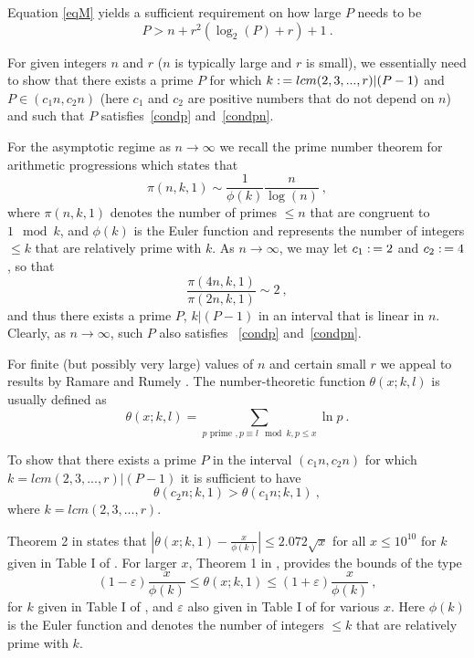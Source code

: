 Equation \eqref{eqM} yields a sufficient requirement on how large
$P$ needs to be
\begin{equation}\label{condpn}P>n+r^2(\log_2(P)+r)+1~.
\end{equation}

For given integers $n$ and $r$ ($n$ is typically large and $r$ is
small), we essentially need to show that there exists a prime $P$
for which $k \asn lcm(2,3,...,r) | (P-1)$ and $P \in (c_1n,c_2n)$
(here $c_1$ and $c_2$ are positive numbers that do not depend on
$n$) and such that $P$ satisfies~\eqref{condp} and~\eqref{condpn}.

For the asymptotic regime as $n \rightarrow \infty$ we recall the
prime number theorem for arithmetic progressions \cite{sopro} which
states that
\begin{equation}
\pi(n,k,1) \sim \frac{1}{\phi(k)} \frac{n}{\log(n)}~,
\end{equation}
where $\pi(n,k,1)$ denotes the number of primes $\leq n$ that are
congruent to $1 \mod k$, and $\phi(k)$ is the Euler function and
represents the number of integers $\leq k$ that are relatively prime
with $k$. As $n \rightarrow \infty$, we may let $c_1 \asn 2$ and
$c_2 \asn 4$, so that
\begin{equation}
\frac{\pi(4n,k,1)}{\pi(2n,k,1)} \sim 2~,
\end{equation}
and thus there exists a prime $P$, $k | (P-1)$ in an interval that
is linear in $n$. Clearly, as $n \rightarrow \infty$, such $P$ also
satisfies ~\eqref{condp} and~\eqref{condpn}.



For finite (but possibly very large) values of $n$ and certain small
$r$ we appeal to results by Ramare and Rumely \cite{rrumely}. The
number-theoretic function $\theta(x;k,l)$ is usually defined as
\[\theta(x;k,l)=\sum_{p \text{ prime }, p \equiv l\mod k, p
\leq x} \ln p~.\]

To show that there exists a prime $P$ in the interval $(c_1n,c_2n)$
for which $k=lcm(2,3,...,r) | (P-1)$  it is sufficient to have
\begin{equation} \label{thetas}\theta(c_2n;k,1)> \theta(c_1n;k,1)~,\end{equation}
where $k=lcm(2,3,...,r)$.

Theorem 2 in \cite{rrumely} states that $|\theta(x;k,1)
-\frac{x}{\phi(k)}| \leq 2.072 \sqrt{x}$ for all $x \leq 10 ^{10}$
for $k$ given in Table I of \cite{rrumely}. For larger $x$, Theorem
1 in \cite{rrumely}, provides the bounds of the type
\begin{equation}
(1-\varepsilon)\frac{x}{\phi(k)} \leq \theta(x;k,1) \leq
(1+\varepsilon)\frac{x}{\phi(k)}~,
\end{equation}
for $k$ given in Table I of \cite{rrumely}, and $\varepsilon$ also
given in Table I of \cite{rrumely} for various $x$. Here $\phi(k)$
is the Euler function and denotes the number of integers $\leq k$
that are relatively prime with $k$.



